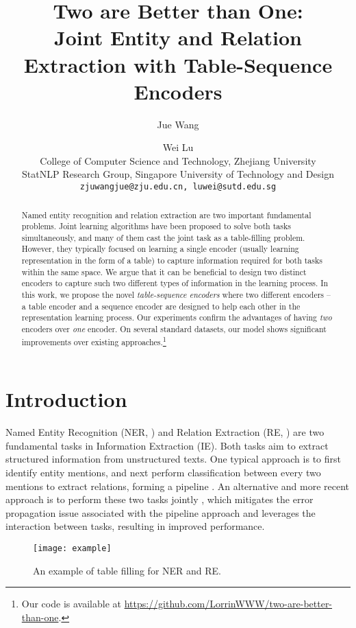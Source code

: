 \documentclass[11pt,a4paper]{article}
\title{Two are Better than One:\\Joint Entity and Relation Extraction with Table-Sequence Encoders}
\author{Jue Wang \and Wei Lu \\
  College of Computer Science and Technology, Zhejiang University \\
  StatNLP Research Group, Singapore University of Technology and Design \\
  {\tt zjuwangjue@zju.edu.cn, luwei@sutd.edu.sg} \\}
\date{}
\begin{document}
\maketitle
\begin{abstract}
Named entity recognition and relation extraction are two important fundamental problems.
Joint learning algorithms have been proposed to solve both tasks simultaneously, {\color{black} and many of them cast the joint task as a table-filling problem.}
However, they typically focused on learning a single encoder (usually learning representation in the form of a table) to capture information required for both tasks within the same space.
We argue that it can be beneficial to design two distinct encoders to capture such two different types of information in the learning process.
In this work, we propose the novel {\em table-sequence encoders} where two different encoders -- a table encoder and a sequence encoder are designed to help each other in the representation learning process.
Our experiments confirm the advantages of having {\em two} encoders over {\em one} encoder. On several standard datasets, our model shows significant improvements over existing approaches.\footnote{
Our code is available at \url{https://github.com/LorrinWWW/two-are-better-than-one}.}

\end{abstract}


\section{Introduction}

Named Entity Recognition (NER, \citealt{florian2006factorizing,florian2010improving}) and
Relation Extraction (RE, \citealt{zhao2005extracting,jiang2007systematic,sun2011semi,plank2013embedding})
are two fundamental tasks in Information Extraction (IE).
Both tasks aim to extract structured information from unstructured texts.
One typical approach is to first identify entity mentions,
and next perform classification between every two mentions to extract relations,
forming a pipeline \cite{zelenko2003kernel,chan2011exploiting}.
An alternative and more recent approach is to perform these two tasks jointly \cite{li2014incremental,miwa2014modeling,miwa2016end},
which mitigates the error propagation issue associated with the pipeline approach and leverages the interaction between tasks,
resulting in improved performance.


\begin{figure}
    \centering
    \texttt{[image: example]}
    \caption{An example of table filling for NER and RE.}
    \label{fig:example}
\end{figure}
\end{document}
